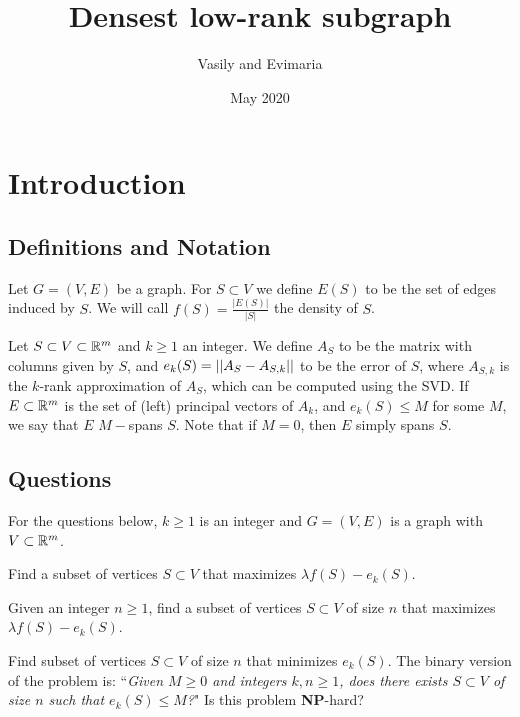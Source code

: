 \documentclass{article}
\title{Densest low-rank subgraph}
\author{Vasily and Evimaria}
\date{May 2020}
\begin{document}
\maketitle

\section{Introduction}
\subsection{Definitions and Notation}
\begin{definition}
Let $G = (V,E)$ be a graph. For $S\subset V$ we define $E(S)$ to be the set of edges induced by $S$. We will call $f(S) = \frac{|E(S)|}{|S|}$ the density of $S$.
\end{definition}

\begin{definition}
Let $S\subset V\subset \mathbb{R}^m$ and $k\geq 1$ an integer. We define $A_S$ to be the matrix with columns given by $S$, and $e_k(S) = ||A_S - A_{S,k}||$ to be the error of $S$, where $A_{S,k}$ is the $k$-rank approximation of $A_S$, which can be computed using the SVD. If $E\subset \mathbb{R}^m$ is the set of (left) principal vectors of $A_k$, and $e_k(S) \leq M$ for some $M$, we say that $E$ $M-$spans $S$. Note that if $M=0$, then $E$ simply spans $S$.
\end{definition}

\subsection{Questions}
For the questions below, $k \geq 1$ is an integer and $G = (V,E)$ is a graph with $V\subset \mathbb{R}^m$.
\begin{question}
    Find a subset of vertices $S\subset V$ that maximizes $\lambda f(S) - e_k(S)$.
\end{question}

\begin{question}
    Given an integer $n\geq 1$, find a subset of vertices $S\subset V$ of size $n$ that maximizes $\lambda f(S) - e_k(S)$.
\end{question}

\begin{question}
    Find subset of vertices $S\subset V$ of size $n$ that minimizes $e_k(S)$. The binary version of the problem is: ``\textit{Given $M \geq 0$ and integers $k,n\geq 1$, does there exists  $S\subset V$ of size $n$ such that $e_k(S)\leq M$?}" Is this problem \textbf{NP}-hard?
\end{question}
\end{document}
